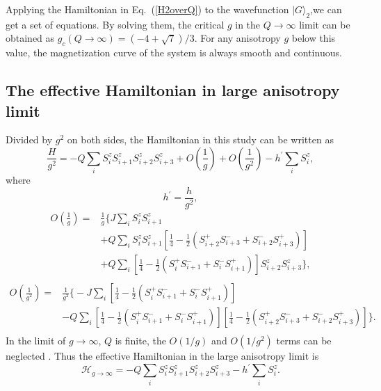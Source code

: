 \documentclass[article,10pt,onecolumn,superscriptaddress,floatfix]{revtex4}
\begin{document}
Applying the Hamiltonian in Eq.~(\ref{H2overQ}) to the wavefunction $|G\rangle_2$,we can get a set of equations.
By solving them, the critical $g$ in the $Q\rightarrow\infty$ limit can be obtained as $g_c(Q\rightarrow\infty)=\left( -4+ \sqrt{7} \right)/3$.
For any anisotropy $g$ below this value, the magnetization curve of the system is always smooth and continuous.

\subsection{The effective Hamiltonian in large anisotropy limit}
Divided by $g^{2}$ on both sides, the Hamiltonian in this study can be written as
\begin{equation}
\frac{H}{g^{2}}  = -Q\sum_{i}S_{i}^{z}S_{i+1}^{z}S_{i+2}^{z}S_{i+3}^{z}+O\left(\frac{1}{g}\right)+O\left(\frac{1}{g^{2}}\right)-h^{\prime}\sum_{i}S_{i}^{z},
\end{equation}
where
\begin{equation}
h^{\prime}=\frac{h}{g^{2}},
\end{equation}
\begin{equation}
\begin{split}
O\left(\frac{1}{g}\right)  = &\frac{1}{g}\Bigg\{ J\sum_{i}S_{i}^{z}S_{i+1}^{z} \\
& +Q\sum_{i}S_{i}^{z}S_{i+1}^{z}\left[\frac{1}{4}-\frac{1}{2}\left(S_{i+2}^{+}S_{i+3}^{-}+S_{i+2}^{-}S_{i+3}^{+}\right)\right]\\
& +Q\sum_{i} \left[\frac{1}{4}-\frac{1}{2}\left(S_{i}^{+}S_{i+1}^{-}+S_{i}^{-}S_{i+1}^{+}\right)\right]S_{i+2}^{z}S_{i+3}^{z}\Bigg\},\\
\end{split}
\end{equation}
\begin{equation}
\begin{split}
O\left(\frac{1}{g^{2}}\right)=&\frac{1}{g^{2}}\Bigg\{-J\sum_{i}\left[\frac{1}{4}-\frac{1}{2}\left(S_{i}^{+}S_{i+1}^{-}+S_{i}^{-}S_{i+1}^{+}\right)\right] \\
& -Q\sum_{i}\left[\frac{1}{4}-\frac{1}{2}\left(S_{i}^{+}S_{i+1}^{-}+S_{i}^{-}S_{i+1}^{+}\right)\right]\left[\frac{1}{4}-\frac{1}{2}\left(S_{i+2}^{+}S_{i+3}^{-}+S_{i+2}^{-}S_{i+3}^{+}\right)\right]\Bigg\}.\\
\end{split}
\end{equation}
In the limit of $g\rightarrow\infty$, $Q$ is finite, the $O(1/g)$ and $O(1/g^{2})$ terms can be neglected . Thus the effective Hamiltonian in the large anisotropy limit is
\begin{equation}
\mathcal{H}_{g\rightarrow\infty}=-Q\sum_{i}S_{i}^{z}S_{i+1}^{z}S_{i+2}^{z}S_{i+3}^{z}-h^{\prime}\sum_{i}S_{i}^{z}.
\end{equation}
\end{document}
